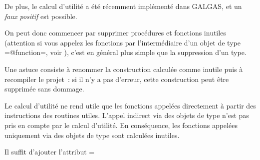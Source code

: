 De plus, le calcul d'utilité a été récemment implémenté dans GALGAS, et un \emph{faux positif} est possible.

On peut donc commencer par supprimer procédures et fonctions inutiles (attention si vous appelez les fonctions par l'intermédiaire d'un objet de type \ggsq=@function=, voir ), c'est en général plus simple que la suppression d'un type.

Une astuce consiste à renommer la construction calculée comme inutile puis à recompiler le projet~: si il n'y a pas d'erreur, cette construction peut être supprimée sans dommage.



Le calcul d'utilité ne rend utile que les fonctions appelées directement à partir des instructions des routines utiles. L'appel indirect via des objets de type  n'est pas pris en compte par le calcul d'utilité. En conséquence, les fonctions appelées uniquement via des objets de type  sont calculées inutiles.

Il suffit d'ajouter l'attribut \ggsq=%


